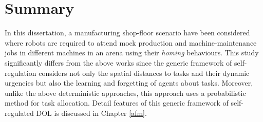 \section{Summary} 

In this dissertation,  a manufacturing shop-floor scenario have been considered where robots are required to attend mock production and machine-maintenance jobs in different machines in an arena using their {\em homing} behaviours. This study significantly differs from the above works since the generic framework of self-regulation considers not only the spatial distances to tasks and their dynamic urgencies but also the learning and forgetting of agents about tasks. Moreover, unlike the above deterministic approaches, this approach uses a probabilistic method for task allocation. Detail features of this generic framework of self-regulated DOL is discussed in Chapter \ref{afm}.